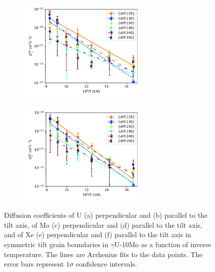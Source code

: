 \documentclass{elsarticle}
\providecommand{\DIFadd}[1]{{\protect\color{blue} \sf #1}} %
\providecommand{\DIFaddFL}[1]{\DIFadd{#1}} %
\providecommand{\DIFaddbeginFL}{} %
\providecommand{\DIFaddendFL}{} %
\begin{document}
\begin{figure}[!ht]
\begin{subfigure}{0.45\textwidth}
\end{subfigure}
\begin{subfigure}{0.45\textwidth}
	\centering
	\caption{}
	\includegraphics[height=5cm]{u10mo_Xe_Dx.pdf}
\end{subfigure}
\begin{subfigure}{0.45\textwidth}
	\centering
	\caption{}
	\includegraphics[height=5cm]{u10mo_Xe_Dz.pdf}
\end{subfigure}
\caption{Diffusion coefficients of U (a) perpendicular and (b) parallel to the tilt axis, of Mo (c) perpendicular and (d) parallel to the tilt axis, and of Xe (e) perpendicular and (f) parallel to the tilt axis in symmetric tilt grain boundaries in $\gamma$U-10Mo as a function of inverse temperature. The lines are Arrhenius fits to the data points. \DIFaddbeginFL \DIFaddFL{The error bars represent $1\sigma$ confidence intervals.}\DIFaddendFL }
\label{fig:u10mo}
\end{figure}
\end{document}

